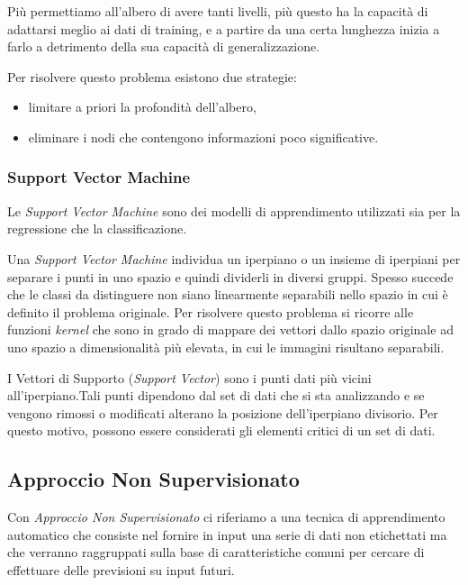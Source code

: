\documentclass[a4paper,12pt]{report}
\begin{document}
Più permettiamo all’albero di avere tanti livelli, più questo ha la capacità di adattarsi meglio ai dati di training, e a partire da una certa lunghezza inizia a farlo a detrimento della sua capacità di generalizzazione. 

Per risolvere questo problema esistono due strategie:
\begin{itemize}
    \item limitare a priori la profondità dell'albero, 
    \item eliminare i nodi che contengono informazioni poco significative.
\end{itemize}


\subsubsection{Support Vector Machine}
Le \textit{Support Vector Machine} sono dei modelli di apprendimento utilizzati sia per la regressione che la classificazione.

Una \textit{Support Vector Machine} individua un iperpiano o un insieme di iperpiani per separare i punti in uno spazio e quindi dividerli in diversi gruppi.
Spesso succede che le classi da distinguere non siano linearmente separabili nello spazio in cui è definito il problema originale. Per risolvere questo problema si ricorre alle funzioni \textit{kernel} che sono in grado di mappare dei vettori dallo spazio originale ad uno spazio a dimensionalità più elevata, in cui le immagini risultano separabili.

I Vettori di Supporto (\textit{Support Vector}) sono i punti dati più vicini all'iperpiano.Tali punti dipendono dal set di dati che si sta analizzando e se vengono rimossi o modificati alterano la posizione dell’iperpiano divisorio. Per questo motivo, possono essere considerati gli elementi critici di un set di dati.

\subsection*{Approccio Non Supervisionato}
Con \textit{Approccio Non Supervisionato} \cite{unsupervised_learning} ci riferiamo a una tecnica di apprendimento automatico che consiste nel fornire in input una serie di dati non etichettati ma che verranno raggruppati sulla base di caratteristiche comuni  per cercare di effettuare delle previsioni su input futuri.
\end{document}

